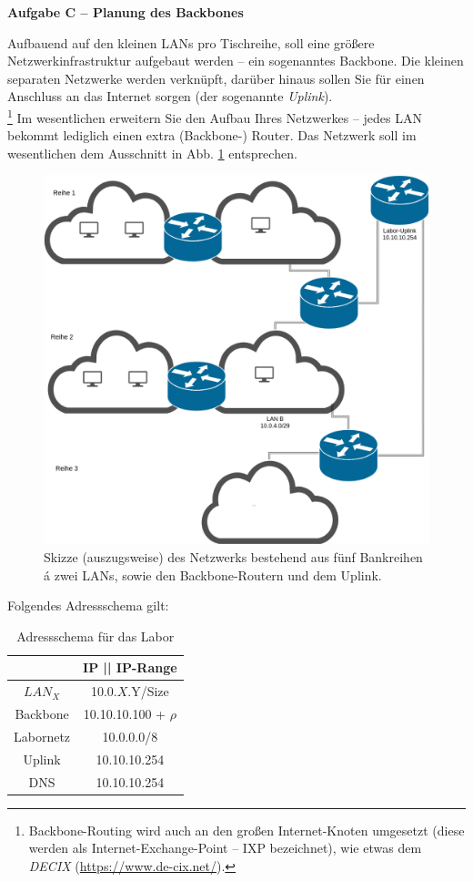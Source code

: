 \documentclass[paper=a4,fontsize=11pt]{scrartcl}%
\numberwithin{equation}{section}
\begin{document}
\begin{center}\Large{\textbf{Aufgabe C -- Planung des Backbones}}\end{center}\vskip0.25in
Aufbauend auf den kleinen LANs pro Tischreihe, soll eine größere Netzwerkinfrastruktur aufgebaut werden -- ein sogenanntes Backbone. Die kleinen separaten Netzwerke werden verknüpft, darüber hinaus sollen Sie für einen Anschluss an das Internet sorgen (der sogenannte \emph{Uplink}).\\
\footnote{Backbone-Routing wird auch an den großen Internet-Knoten umgesetzt (diese werden als Internet-Exchange-Point -- IXP bezeichnet), wie etwas dem \emph{DECIX} (\url{https://www.de-cix.net/}).}
Im wesentlichen erweitern Sie den Aufbau Ihres Netzwerkes -- jedes LAN bekommt lediglich einen extra (Backbone-) Router. Das Netzwerk soll im wesentlichen dem Ausschnitt in Abb. \ref{backbone} entsprechen.
	\begin{figure}[H]
	\centering
	\includegraphics[scale=0.25]{backbone}
	\caption{Skizze (auszugsweise) des Netzwerks bestehend aus fünf Bankreihen á zwei LANs, sowie den Backbone-Routern und dem Uplink.}
	\label{backbone}
	\end{figure}
Folgendes Adressschema gilt:
\begin{table}[H]
\caption{Adressschema für das Labor}
\label{adress_scheme}
\centering
\begin{tabular}{|c|c|}\hline
 & \textbf{IP  || IP-Range} \\ \hline
 $LAN_X$ & 10.0.$X$.Y/Size \\ \hline
 Backbone & 10.10.10.100 + $\rho$ \\ \hline
 Labornetz & 10.0.0.0/8 \\ \hline
 Uplink & 10.10.10.254 \\ \hline
 DNS & 10.10.10.254 \\ \hline
\end{tabular}
\end{table} 
\end{document}
